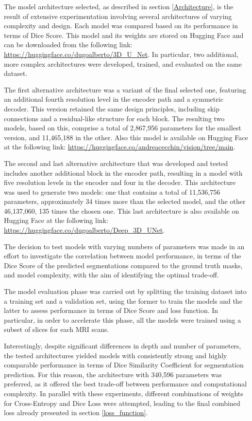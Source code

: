\documentclass[10pt,twocolumn,letterpaper]{article}
\begin{document}
The model architecture selected, as described in section \ref{Architecture}, is the result of extensive experimentation involving several architectures of varying complexity and design. Each model was compared based on its performance in terms of Dice Score. This model and its weights are stored on Hugging Face and can be downloaded from the following link: \url{https://huggingface.co/dugoalberto/3D_U_Net}.
In particular, two additional, more complex architectures were developed, trained, and evaluated on the same dataset.

The first alternative architecture was a variant of the final selected one, featuring an additional fourth resolution level in the encoder path and a symmetric decoder. This version retained the same design principles, including skip connections and a residual-like structure for each block. The resulting two models, based on this, comprise a total of 2,867,956 parameters for the smallest version, and 11,465,188 in the other. Also this model is available on Hugging Face at the following link: \url{https://huggingface.co/andreacecchin/vision/tree/main}.

The second and last alternative architecture that was developed and tested includes another additional block in the encoder path, resulting in a model with five resolution levels in the encoder and four in the decoder. This architecture was used to generate two models: one that contains a total of 11,536,756 parameters, approximately 34 times more than the selected model, and the other 46,137,060, 135 times the chosen one. This last architecture is also available on Hugging Face at the following link: \url{https://huggingface.co/dugoalberto/Deep_3D_UNet}.

The decision to test models with varying numbers of parameters was made in an effort to investigate the correlation between model performance, in terms of the Dice Score of the predicted segmentations compared to the ground truth masks, and model complexity, with the aim of identifying the optimal trade-off.

The model evaluation phase was carried out by splitting the training dataset into a training set and a validation set, using the former to train the models and the latter to assess performance in terms of Dice Score and loss function. In particular, in order to accelerate this phase, all the models were trained using a subset of slices for each MRI scans.

Interestingly, despite significant differences in depth and number of parameters, the tested architectures yielded models with consistently strong and highly comparable performance in terms of  Dice Similarity Coefficient for segmentation prediction.
For this reason, the architecture with 340,596 parameters was preferred, as it offered the best trade-off between performance and computational complexity. In parallel with these experiments, different combinations of weights for Cross-Entropy and Dice Loss were attempted, leading to the final combined loss already presented in section \ref{loss_function}.
\end{document}
